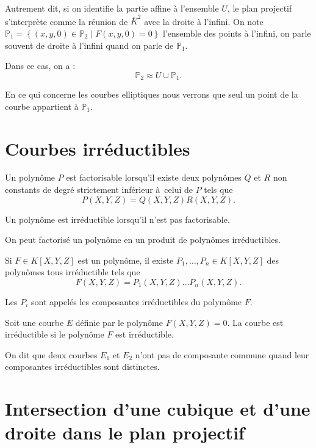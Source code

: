 Autrement dit, si on identifie la partie affine à l'ensemble $U$, le plan projectif s'interprète comme la
réunion de $\overline{K}^2$ avec la droite à l'infini.
On note $\mathbb{P}_{1} = \left\{ (x,y,0) \in \mathbb{P}_{2} \mid F(x,y,0) = 0 \right\} $
l'ensemble des points à l'infini, on parle souvent de droite à l'infini quand on parle de
$\mathbb{P}_{1}$.

Dans ce cas, on a :
\[
\mathbb{P}_{2} \approx U \cup \mathbb{P}_{1}
.\] 


\begin{remarque}
    En ce qui concerne les courbes elliptiques nous verrons que seul un point de la courbe
    appartient à $\mathbb{P}_{1}$.
\end{remarque}

\section{Courbes irréductibles}

\begin{definition}
    \label{def:polyIrr}
    Un polynôme $P$ est factorisable lorsqu'il existe deux polynômes $Q$ et $R$ non
    constants de degré strictement inférieur à celui de $P$ tels que
    \[
    P(X,Y,Z) = Q(X,Y,Z)R(X,Y,Z)
    .\] 

    Un polynôme est irréductible lorsqu'il n'est pas factorisable.

    On peut factorisé un polynôme en un produit de polynômes irréductibles. 

    Si $F
    \in K[X,Y,Z]$ est un polynôme, il existe $P_1,\ldots,P_{n} \in K[X,Y,Z]$ des polynômes
    tous
    irréductible tels que
    \[
    F(X,Y,Z)= P_1(X,Y,Z)\ldots P_{n}(X,Y,Z)
    .\] 

    Les $P_{i}$ sont appelés les composantes irréductibles du polymôme $F$.
\end{definition}

\begin{definition}
    \label{def:courbeIrr}
    
    Soit une courbe $E$ définie par le polynôme $F(X,Y,Z) = 0$. La courbe est irréductible si
    le polynôme $F$ est irréductible.
\end{definition}

On dit que deux courbes $E_1$ et $E_2$ n'ont pas de composante commune quand leur
composantes irréductibles sont distinctes.

\section{Intersection d'une cubique et d'une droite dans le plan projectif}

